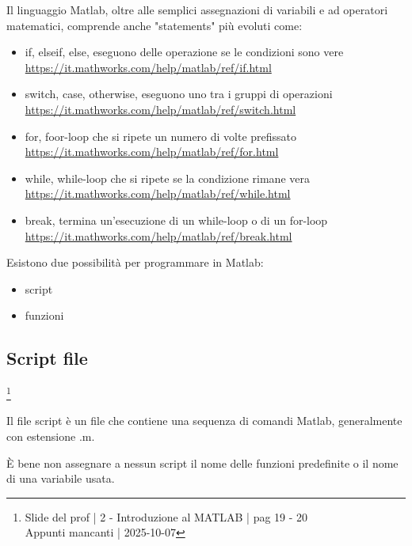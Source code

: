 Il linguaggio Matlab, oltre alle semplici assegnazioni di variabili e ad operatori matematici, comprende anche "statements" più evoluti come: 

\begin{itemize}
    \item if, elseif, else, eseguono  delle operazione se le condizioni sono vere \\\url{https://it.mathworks.com/help/matlab/ref/if.html} 
    \item switch, case, otherwise, eseguono uno tra i gruppi di operazioni \\\url{https://it.mathworks.com/help/matlab/ref/switch.html} 
    \item for, foor-loop che si ripete un numero di volte prefissato \\\url{https://it.mathworks.com/help/matlab/ref/for.html} 
    \item while, while-loop che si ripete se la condizione rimane vera \\\url{https://it.mathworks.com/help/matlab/ref/while.html} 
    \item break, termina un'esecuzione di un while-loop o di un for-loop \\\url{https://it.mathworks.com/help/matlab/ref/break.html}
\end{itemize}

Esistono due possibilità per programmare in Matlab: 

\begin{itemize}
    \item script 
    \item funzioni 
\end{itemize} 

\newpage 

\subsection{Script file}

\footnote{ 
    Slide del prof | 2 - Introduzione al MATLAB | pag 19 - 20\\
    Appunti mancanti | 2025-10-07 
}

Il file script è un file che contiene una sequenza di comandi Matlab, generalmente con estensione .m. \newline 

È bene non assegnare a nessun script il nome delle funzioni predefinite o il nome di una variabile usata. \newline 

